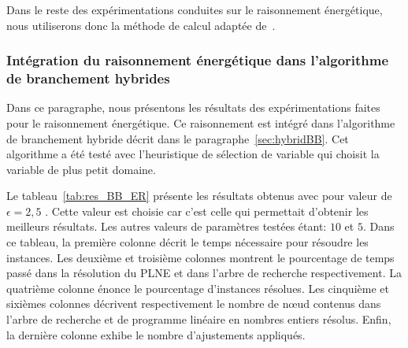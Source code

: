 Dans le reste des expérimentations conduites sur le raisonnement
énergétique, nous utiliserons donc la méthode de calcul adaptée de~\cite{DP}. 

\subsubsection{Intégration du raisonnement énergétique dans
  l'algorithme de branchement hybrides}

Dans ce paragraphe, nous présentons les résultats des expérimentations
faites pour le raisonnement énergétique. Ce raisonnement est intégré
dans l'algorithme de branchement hybride décrit dans le
paragraphe~\ref{sec:hybridBB}. Cet algorithme a été testé avec
l'heuristique de sélection de variable qui choisit la variable de plus
petit domaine.

Le tableau~\ref{tab:res_BB_ER} présente les résultats obtenus avec 
pour valeur de $\epsilon=2,5$ . Cette valeur est choisie car c'est celle
qui permettait d'obtenir les meilleurs résultats. Les autres valeurs
de paramètres testées étant: $10$ et $5$. Dans ce tableau, la première
colonne décrit le temps nécessaire pour résoudre les instances. Les
deuxième et troisième colonnes montrent le pourcentage de temps passé
dans la résolution du PLNE et dans l'arbre de recherche
respectivement. La quatrième colonne énonce le pourcentage d'instances
résolues. Les cinquième et sixièmes colonnes décrivent respectivement
 le nombre de n\oe ud contenus dans l'arbre de recherche et de programme
linéaire en nombres entiers résolus. Enfin, la dernière colonne
exhibe le nombre d'ajustements appliqués. 

